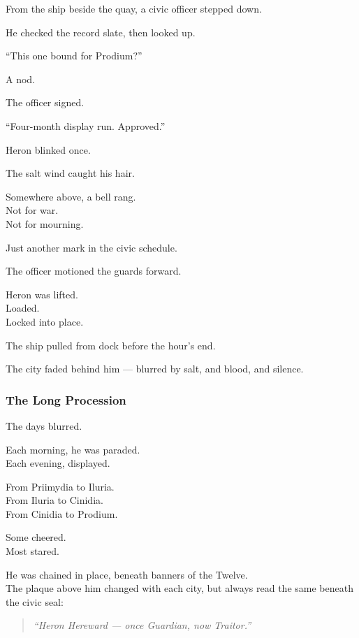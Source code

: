 \documentclass[12pt]{article}
\begin{document}
From the ship beside the quay, a civic officer stepped down.

He checked the record slate, then looked up.

“This one bound for Prodium?”

A nod.

The officer signed.

“Four-month display run. Approved.”

\vspace{1em}

Heron blinked once.

The salt wind caught his hair.

Somewhere above, a bell rang.\\
Not for war.\\
Not for mourning.

Just another mark in the civic schedule.

\vspace{1em}

The officer motioned the guards forward.

Heron was lifted.\\
Loaded.\\
Locked into place.

The ship pulled from dock before the hour’s end.

The city faded behind him — blurred by salt, and blood, and silence.

\dotfill

\subsubsection*{The Long Procession}

The days blurred.

Each morning, he was paraded.\\
Each evening, displayed.

From Priimydia to Iluria.\\
From Iluria to Cinidia.\\
From Cinidia to Prodium.

Some cheered.\\
Most stared.

He was chained in place, beneath banners of the Twelve.\\
The plaque above him changed with each city, but always read the same beneath the civic seal:

\begin{quote}
\textit{“Heron Hereward — once Guardian, now Traitor.”}
\end{quote}
\end{document}

